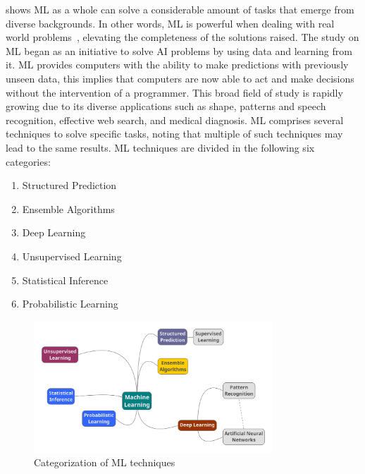  shows \ac{ML} as a whole can solve a considerable amount of tasks that emerge from diverse backgrounds. In other words, \ac{ML} is powerful when dealing with real world problems~\cite{michalski13}, elevating the completeness of the solutions raised. 
The study on \ac{ML} began as an initiative to solve \ac{AI} problems by using data and learning from it. \ac{ML} provides computers with the ability to make predictions with previously unseen data, this implies that computers are now able to act and make decisions without the intervention of a programmer. This broad field of study is rapidly growing due to its diverse applications such as shape, patterns and speech recognition, effective web search, and medical diagnosis. \ac{ML} comprises several techniques to solve specific tasks, noting that multiple of such techniques may lead to the same results. \ac{ML} techniques are divided in the following six categories:
\begin{enumerate}
 \item Structured Prediction
 \item Ensemble Algorithms
 \item Deep Learning 
 \item Unsupervised Learning
 \item Statistical Inference 
 \item Probabilistic Learning
\end{enumerate}


\begin{figure}[htbp]
  \centering
  \includegraphics[width=0.8\textwidth]{images/ai-categorization}
  \caption{Categorization of \acl{ML} techniques}
  \label{fig:ai-categorization}
\end{figure}

